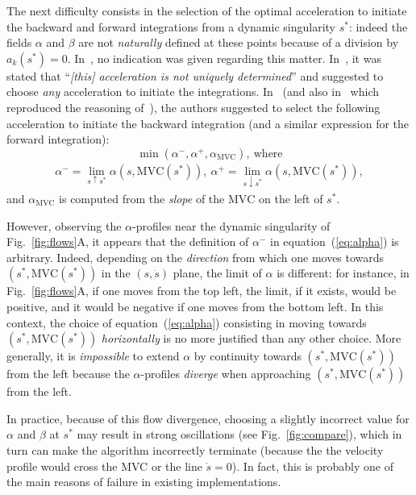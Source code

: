 \documentclass[9pt,technote]{IEEEtran}
\newcommand{\MVC}{\mathrm{MVC}}
\begin{document}
The next difficulty consists in the selection of the optimal
acceleration to initiate the backward and forward integrations from a
dynamic singularity $s^*$: indeed the fields $\alpha$ and $\beta$ are
not \emph{naturally} defined at these points because of a division by
$a_k(s^*)=0$. In~\cite{PJ87jra}, no indication was given regarding
this matter. In~\cite{SY89tra}, it was stated that ``\emph{[this]
  acceleration is not uniquely determined}'' and suggested to choose
\emph{any} acceleration to initiate the
integrations. In~\cite{SL92jdsmc} (and also
in~\cite{ChoX05book} which reproduced the reasoning
of~\cite{SL92jdsmc}), the authors suggested to select the
following acceleration to initiate the backward integration (and a
similar expression for the forward integration):
\begin{equation}
  \label{eq:shiller}
  \min(\alpha^-,\alpha^+,\alpha_\MVC),\ \textrm{where}
\end{equation}
\begin{eqnarray}
  \label{eq:alpha}
  \alpha^-=\lim_{s\uparrow s^*} \alpha(s,\MVC(s^*)),\
  \alpha^+=\lim_{s\downarrow s^*} \alpha(s,\MVC(s^*)),
\end{eqnarray}
and $\alpha_\MVC$ is computed from the \emph{slope} of the $\MVC$
on the left of $s^*$.

However, observing the $\alpha$-profiles near the dynamic singularity
of Fig.~\ref{fig:flows}A, it appears that the definition of $\alpha^-$
in equation~(\ref{eq:alpha}) is arbitrary. Indeed, depending on the
\emph{direction} from which one moves towards $(s^*,\MVC(s^*))$ in the
$(s,\dot s)$ plane, the limit of $\alpha$ is different: for instance,
in Fig.~\ref{fig:flows}A, if one moves from the top left, the limit,
if it exists, would be positive, and it would be negative if one moves
from the bottom left. In this context, the choice of
equation~(\ref{eq:alpha}) consisting in moving towards
$(s^*,\MVC(s^*))$ \emph{horizontally} is no more justified than any
other choice. More generally, it is \emph{impossible} to extend
$\alpha$ by continuity towards $(s^*,\MVC(s^*))$ from the left because
the $\alpha$-profiles \emph{diverge} when approaching
$(s^*,\MVC(s^*))$ from the left.

In practice, because of this flow divergence, choosing a slightly
incorrect value for $\alpha$ and $\beta$ at $s^*$ may result in strong
oscillations (see Fig.~\ref{fig:compare}), which in turn can make the
algorithm incorrectly terminate (because the the velocity profile
would cross the MVC or the line $\dot s=0$). In fact, this is probably
one of the main reasons of failure in existing implementations.
\end{document}
